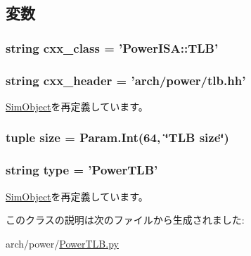 \subsection{変数}
\hypertarget{classPowerTLB_1_1PowerTLB_a58cd55cd4023648e138237cfc0822ae3}{
\subsubsection[{cxx\_\-class}]{\setlength{\rightskip}{0pt plus 5cm}string {\bf cxx\_\-class} = '{\bf PowerISA::TLB}'}}
\label{classPowerTLB_1_1PowerTLB_a58cd55cd4023648e138237cfc0822ae3}
\hypertarget{classPowerTLB_1_1PowerTLB_a17da7064bc5c518791f0c891eff05fda}{
\subsubsection[{cxx\_\-header}]{\setlength{\rightskip}{0pt plus 5cm}string {\bf cxx\_\-header} = 'arch/power/tlb.hh'}}
\label{classPowerTLB_1_1PowerTLB_a17da7064bc5c518791f0c891eff05fda}


\hyperlink{classm5_1_1SimObject_1_1SimObject_a17da7064bc5c518791f0c891eff05fda}{SimObject}を再定義しています。\hypertarget{classPowerTLB_1_1PowerTLB_a377e5da8df1f89c5468c8b8cd07eac89}{
\subsubsection[{size}]{\setlength{\rightskip}{0pt plus 5cm}tuple {\bf size} = Param.Int(64, \char`\"{}TLB {\bf size}\char`\"{})}}
\label{classPowerTLB_1_1PowerTLB_a377e5da8df1f89c5468c8b8cd07eac89}
\hypertarget{classPowerTLB_1_1PowerTLB_acce15679d830831b0bbe8ebc2a60b2ca}{
\subsubsection[{type}]{\setlength{\rightskip}{0pt plus 5cm}string {\bf type} = '{\bf PowerTLB}'}}
\label{classPowerTLB_1_1PowerTLB_acce15679d830831b0bbe8ebc2a60b2ca}


\hyperlink{classm5_1_1SimObject_1_1SimObject_acce15679d830831b0bbe8ebc2a60b2ca}{SimObject}を再定義しています。

このクラスの説明は次のファイルから生成されました:\begin{DoxyCompactItemize}
\item 
arch/power/\hyperlink{PowerTLB_8py}{PowerTLB.py}\end{DoxyCompactItemize}
